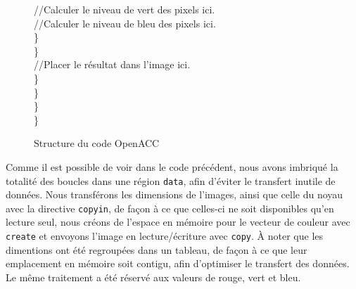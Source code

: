 \documentclass[11pt]{report}
\begin{document}
\begin{figure}[H]
{	            \hspace*{1em}\hspace*{1em}\hspace*{1em}\hspace*{1em}\hspace*{1em}\hspace*{1em}//Calculer le niveau de vert des pixels ici.\\
	            \hspace*{1em}\hspace*{1em}\hspace*{1em}\hspace*{1em}\hspace*{1em}\hspace*{1em}//Calculer le niveau de bleu des pixels ici.\\
		        \hspace*{1em}\hspace*{1em}\hspace*{1em}\hspace*{1em}\hspace*{1em}\}\\
		        \hspace*{1em}\hspace*{1em}\hspace*{1em}\hspace*{1em}\}\\
		        \hspace*{1em}\hspace*{1em}\hspace*{1em}\hspace*{1em}//Placer le résultat dans l'image ici.\\
		        \hspace*{1em}\hspace*{1em}\hspace*{1em}\}\\
		        \hspace*{1em}\hspace*{1em}\}\\
		        \hspace*{1em}\}\\
		        \}\\
	        }
	        \caption{Structure du code OpenACC}
        \end{figure}
        
        \bigskip
        Comme il est possible de voir dans le code précédent, nous avons imbriqué la totalité des boucles dans une région \texttt{data}, afin d'éviter le transfert inutile de données. Nous transférons les dimensions de l'images, ainsi que celle du noyau avec la directive \texttt{copyin}, de façon à ce que celles-ci ne soit disponibles qu'en lecture seul, nous créons de l'espace en mémoire pour le vecteur de couleur avec \texttt{create} et envoyons l'image en lecture/écriture avec \texttt{copy}. À noter que les dimentions ont été regroupées dans un tableau, de façon à ce que leur emplacement en mémoire soit contigu, afin d'optimiser le transfert des données. Le même traitement a été réservé aux valeurs de rouge, vert et bleu.
	
\end{document}

